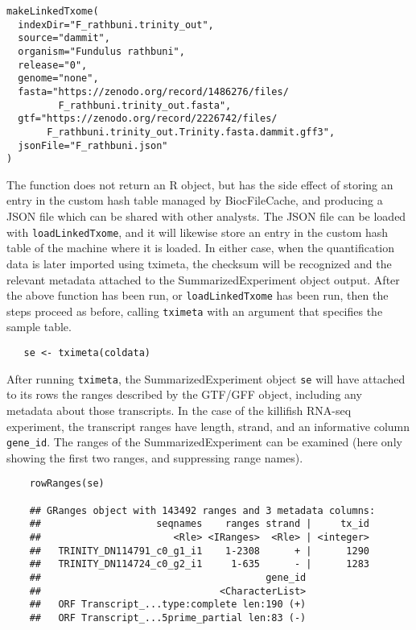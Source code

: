 \documentclass[10pt,letterpaper]{article}
\begin{document}
\begin{verbatim}
makeLinkedTxome(
  indexDir="F_rathbuni.trinity_out", 
  source="dammit",
  organism="Fundulus rathbuni", 
  release="0", 
  genome="none",
  fasta="https://zenodo.org/record/1486276/files/
         F_rathbuni.trinity_out.fasta",
  gtf="https://zenodo.org/record/2226742/files/
       F_rathbuni.trinity_out.Trinity.fasta.dammit.gff3",
  jsonFile="F_rathbuni.json"
)
\end{verbatim}

The function does not return an R object, but has the side effect of
storing an entry in the custom hash table managed by BiocFileCache,
and producing a JSON file which can be shared with other analysts. The
JSON file can be loaded with \texttt{loadLinkedTxome}, and it will
likewise store an entry in the custom hash table of the machine where
it is loaded. In either case, when the quantification data \citep{killi-quant} is later
imported using tximeta, the checksum will be recognized and the
relevant metadata attached to the SummarizedExperiment object output.
After the above function has been run, or \texttt{loadLinkedTxome} has
been run, then the steps proceed as before, calling \texttt{tximeta}
with an argument that specifies the sample table.

\begin{verbatim}
   se <- tximeta(coldata)
\end{verbatim}

After running \texttt{tximeta}, the SummarizedExperiment object
\texttt{se} will have attached to its rows the ranges described by the
GTF/GFF object, including any metadata about those transcripts. In the
case of the killifish RNA-seq experiment, the transcript ranges have
length, strand, and an informative column \texttt{gene\_id}. The ranges
of the SummarizedExperiment can be examined (here only showing the first
two ranges, and suppressing range names).

\begin{verbatim}
    rowRanges(se)

    ## GRanges object with 143492 ranges and 3 metadata columns:
    ##                    seqnames    ranges strand |     tx_id
    ##                       <Rle> <IRanges>  <Rle> | <integer>
    ##   TRINITY_DN114791_c0_g1_i1    1-2308      + |      1290
    ##   TRINITY_DN114724_c0_g2_i1     1-635      - |      1283
    ##                                       gene_id
    ##                               <CharacterList>
    ##   ORF Transcript_...type:complete len:190 (+)
    ##   ORF Transcript_...5prime_partial len:83 (-)
\end{verbatim}
\end{document}
